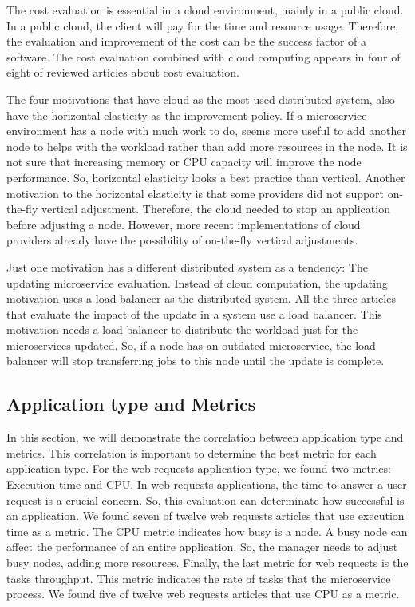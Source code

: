 The cost evaluation is essential in a cloud environment, mainly in a public cloud. In a public cloud, the client will pay for the time and resource usage. Therefore, the evaluation and improvement of the cost can be the success factor of a software. The cost evaluation combined with cloud computing appears in four of eight of reviewed articles about cost evaluation.

The four motivations that have cloud as the most used distributed system, also have the horizontal elasticity as the improvement policy. If a microservice environment has a node with much work to do, seems more useful to add another node to helps with the workload rather than add more resources in the node. It is not sure that increasing memory or CPU capacity will improve the node performance. So, horizontal elasticity looks a best practice than vertical. Another motivation to the horizontal elasticity is that some providers did not support on-the-fly vertical adjustment. Therefore, the cloud needed to stop an application before adjusting a node. However, more recent implementations of cloud providers already have the possibility of on-the-fly vertical adjustments.

Just one motivation has a different distributed system as a tendency: The updating microservice evaluation. Instead of cloud computation, the updating motivation uses a load balancer as the distributed system. All the three articles that evaluate the impact of the update in a system use a load balancer. This motivation needs a load balancer to distribute the workload just for the microservices updated. So, if a node has an outdated microservice, the load balancer will stop transferring jobs to this node until the update is complete.

\subsection{Application type and Metrics}
In this section, we will demonstrate the correlation between application type and metrics. This correlation is important to determine the best metric for each application type. For the web requests application type, we found two metrics: Execution time and CPU. In web requests applications, the time to answer a user request is a crucial concern. So, this evaluation can determinate how successful is an application. We found seven of twelve web requests articles that use execution time as a metric. The CPU metric indicates how busy is a node. A busy node can affect the performance of an entire application. So, the manager needs to adjust busy nodes, adding more resources. Finally, the last metric for web requests is the tasks throughput. This metric indicates the rate of tasks that the microservice process. We found five of twelve web requests articles that use CPU as a metric.

